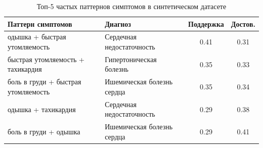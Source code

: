 \begin{table}[H]
\centering
\caption{Топ-5 частых паттернов симптомов в синтетическом датасете}
\label{tab:patterns}
\begin{tabular}{p{5.5cm}p{4.5cm}cc}
\toprule
Паттерн симптомов & Диагноз & Поддержка & Достов. \\
\midrule
одышка + быстрая утомляемость & Сердечная недостаточность & 0.41 & 0.31 \\
быстрая утомляемость + тахикардия & Гипертоническая болезнь & 0.35 & 0.33 \\
боль в груди + быстрая утомляемость & Ишемическая болезнь сердца & 0.35 & 0.34 \\
одышка + тахикардия & Сердечная недостаточность & 0.29 & 0.38 \\
боль в груди + одышка & Ишемическая болезнь сердца & 0.29 & 0.41 \\
\bottomrule
\end{tabular}
\end{table}